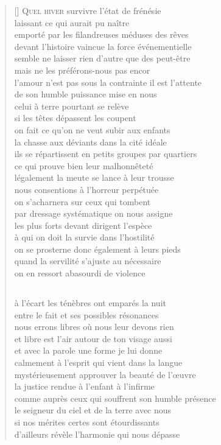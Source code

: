 \documentclass[a4paper, titlepage, twoside, 12pt]{book}
\begin{document}
\newpage

\vspace*{2cm}
\settowidth{\versewidth}{cristaux infimes variations de temperature}
\begin{verse}[\versewidth]
{\lettrine[lines=1]{\textcolor[gray]{0.6}{Q}}{\space uel hiver}} survivre l'état de frénésie\\
laissant ce qui aurait pu naître\\
emporté par les filandreuses méduses des rêves\\
devant l'histoire vaincue la force événementielle\\
semble ne laisser rien d'autre que des peut-être\\
mais ne les préférons-nous pas encor\\
l'amour n'est pas sous la contrainte il est l'attente\\
de son humble puissance mise en nous\\
celui à terre pourtant se relève\\
si les têtes dépassent les coupent\\
on fait ce qu'on ne veut subir aux enfants\\
la chasse aux déviants dans la cité idéale\\
ils se répartissent en petits groupes par quartiers\\
ce qui prouve bien leur malhonnêteté\\
légalement la meute se lance à leur trousse\\
nous consentions à l'horreur perpétuée\\
on s'acharnera sur ceux qui tombent\\
par dressage systématique on nous assigne\\
les plus forts devant dirigent l'espèce\\
à qui on doit la survie dans l'hostilité\\
on se prosterne donc également à leurs pieds\\
quand la servilité s'ajuste au nécessaire\\
on en ressort abasourdi de violence
\subsection*{}
à l'écart les ténèbres ont emparés la nuit\\
entre le fait et ses possibles résonances\\
nous errons libres où nous leur devons rien\\
et libre est l'air autour de ton visage aussi\\
et avec la parole une forme je lui donne\\
calmement à l'esprit qui vient dans la langue\\
mystérieusement approuver la beauté de l'\oe uvre\\
la justice rendue à l'enfant à l'infirme\\
comme auprès ceux qui souffrent son humble présence\\
le seigneur du ciel et de la terre avec nous\\
si nos mérites certes sont étourdissants\\
d'ailleurs révèle l'harmonie qui nous dépasse

\end{verse}
\end{document}
